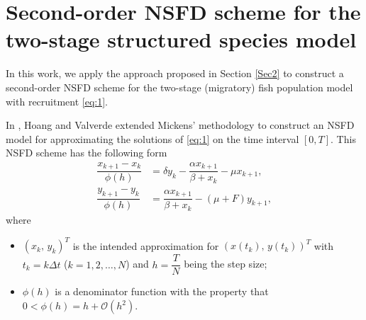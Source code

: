 \documentclass[12pt]{article}
\theoremstyle{definition}
\theoremstyle{remark}
\numberwithin{equation}{section}
\begin{document}
\section{Second-order NSFD scheme for the two-stage structured species model}\label{Sec3}
In this work, we apply the approach proposed in Section \ref{Sec2} to construct a second-order NSFD scheme for the two-stage (migratory) fish population model with recruitment \eqref{eq:1}.

In \cite{HoangValverde}, Hoang and Valverde extended Mickens' methodology \cite{Mickens1, Mickens2, Mickens3, Mickens4, Mickens5} to construct an NSFD model for approximating the solutions of \eqref{eq:1} on the time interval $[0, T]$. This NSFD scheme has the following form
\begin{equation}\label{eq:2}
\begin{split}
\dfrac{x_{k+1}- x_k}{\phi(h)} &= \delta y_k - \dfrac{\alpha x_{k+1}}{\beta + x_k}- \mu x_{k + 1}, \\
\dfrac{y_{k+1} - y_k}{\phi(h)} &= \dfrac{\alpha x_{k + 1}}{\beta + x_k} - (\mu+F) y_{k+1},
\end{split}
\end{equation}
where
\begin{itemize}
\item $(x_k,\,y_k)^T$ is the intended approximation for $(x(t_k),\,y(t_k))^T$ with $t_k = k\Delta t$ ($k = 1, 2, \ldots, N$) and $h= \dfrac{T}{N}$ being the step size;
\item $\phi(h)$ is a denominator function with the property that $0 < \phi(h) = h + \mathcal{O}(h^2)$.
\end{itemize}
\end{document}
